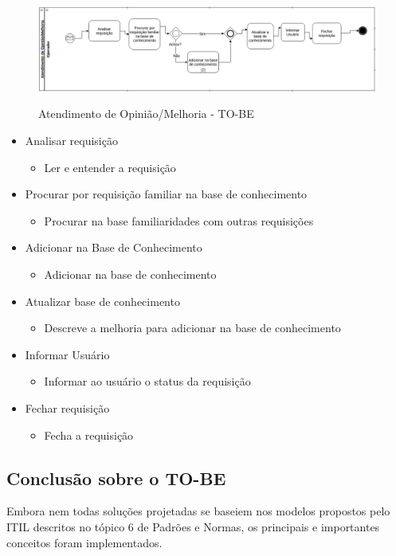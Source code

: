 \begin{figure}[!h]
\caption{Atendimento de Opinião/Melhoria - TO-BE}
\centering %
\includegraphics[width=15cm]{to_be/04_atendimento_de_melhoria.png}
\label{figura:atendimento_de_erro_to_be}
\end{figure}

\begin{itemize}[noitemsep]
	\item Analisar requisição
	\begin{itemize}
		\item Ler e entender a requisição
	\end{itemize}
	\item Procurar por requisição familiar na base de conhecimento
		\begin{itemize}
			\item Procurar na base familiaridades com outras requisições
		\end{itemize}
	\item Adicionar na Base de Conhecimento
		\begin{itemize}
			\item Adicionar na base de conhecimento
		\end{itemize}
	\item Atualizar base de conhecimento
	\begin{itemize}
		\item Descreve a melhoria para adicionar na base de conhecimento
	\end{itemize}
	\item Informar Usuário
	\begin{itemize}
		\item Informar ao usuário o status da requisição
	\end{itemize}
	\item Fechar requisição
	\begin{itemize}
		\item Fecha a requisição
	\end{itemize}
\end{itemize}



\subsection{Conclusão sobre o TO-BE}
Embora nem todas soluções projetadas se baseiem nos modelos propostos pelo ITIL
descritos no tópico 6 de Padrões e Normas, os principais e importantes conceitos
foram implementados.

